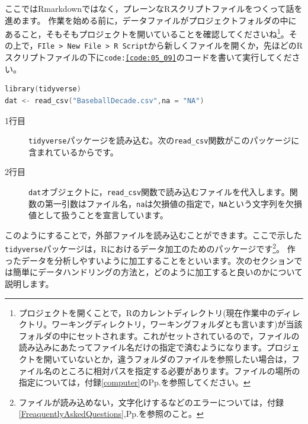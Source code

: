 \documentclass{ltjsbook}
\begin{document}
ここではRmarkdownではなく，プレーンなRスクリプトファイルをつくって話を進めます。
作業を始める前に，データファイルがプロジェクトフォルダの中にあること，そもそもプロジェクトを開いていることを確認してくださいね\footnote{プロジェクトを開くことで，Rのカレントディレクトリ(現在作業中のディレクトリ。ワーキングディレクトリ，ワーキングフォルダとも言います)が当該フォルダの中にセットされます。これがセットされているので，ファイルの読み込みにあたってファイル名だけの指定で済むようになります。プロジェクトを開いていないとか，違うフォルダのファイルを参照したい場合は，ファイル名のところに相対パスを指定する必要があります。ファイルの場所の指定については，付録\ref{computer}のPp.\pageref{setLocation}を参照してください。}。その上で，\verb|FIle > New File > R Script|から新しくファイルを開くか，先ほどのRスクリプトファイルの下に\texttt{code:\ref{code:05_09}}のコードを書いて実行してください。

\begin{lstlisting}[language=c++,label={code:05_09},caption={CSVファイルを読み込む}]
library(tidyverse)
dat <- read_csv("BaseballDecade.csv",na = "NA")
\end{lstlisting}

\begin{description}
	\item[1行目] \texttt{tidyverse}パッケージを読み込む。次の\verb|read_csv|関数がこのパッケージに含まれているからです。
	\item[2行目] \texttt{dat}オブジェクトに，\verb|read_csv|関数で読み込むファイルを代入します。関数の第一引数はファイル名，\verb|na|は欠損値の指定で，\texttt{NA}という文字列を欠損値として扱うことを宣言しています。
\end{description}

このようにすることで，外部ファイルを読み込むことができます。ここで示した\verb|tidyverse|パッケージは，Rにおけるデータ加工のためのパッケージです\footnote{ファイルが読み込めない，文字化けするなどのエラーについては，付録\ref{FreaquentlyAskedQuestions},Pp.\pageref{FreaquentlyAskedQuestions}を参照のこと。}。
作ったデータを分析しやすいように加工することをといいます。次のセクションでは簡単にデータハンドリングの方法と，どのように加工すると良いのかについて説明します。
\end{document}
